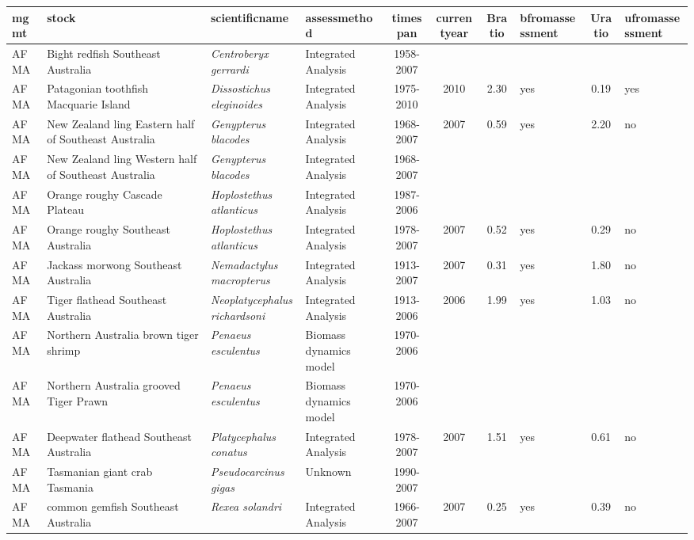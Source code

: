 \begin{longtable}{p{1.8cm}p{3.5cm}p{3.5cm}p{3cm}cccp{0.9cm}cp{0.9cm}}
  \hline
mgmt & stock & scientificname & assessmethod & timespan & currentyear & Bratio & bfromassessment & Uratio & ufromassessment \\ 
  \hline
AFMA & Bight redfish Southeast Australia & \textit{Centroberyx gerrardi} & Integrated Analysis & 1958-2007 &  &  &  &  &  \\ 
  AFMA & Patagonian toothfish Macquarie Island & \textit{Dissostichus eleginoides} & Integrated Analysis & 1975-2010 & 2010 & 2.30 & yes & 0.19 & yes \\ 
  AFMA & New Zealand ling Eastern half of Southeast Australia & \textit{Genypterus blacodes} & Integrated Analysis & 1968-2007 & 2007 & 0.59 & yes & 2.20 & no \\ 
  AFMA & New Zealand ling Western half of Southeast Australia & \textit{Genypterus blacodes} & Integrated Analysis & 1968-2007 &  &  &  &  &  \\ 
  AFMA & Orange roughy Cascade Plateau & \textit{Hoplostethus atlanticus} & Integrated Analysis & 1987-2006 &  &  &  &  &  \\ 
  AFMA & Orange roughy Southeast Australia & \textit{Hoplostethus atlanticus} & Integrated Analysis & 1978-2007 & 2007 & 0.52 & yes & 0.29 & no \\ 
  AFMA & Jackass morwong Southeast Australia & \textit{Nemadactylus macropterus} & Integrated Analysis & 1913-2007 & 2007 & 0.31 & yes & 1.80 & no \\ 
  AFMA & Tiger flathead Southeast Australia & \textit{Neoplatycephalus richardsoni} & Integrated Analysis & 1913-2006 & 2006 & 1.99 & yes & 1.03 & no \\ 
  AFMA & Northern Australia brown tiger shrimp & \textit{Penaeus esculentus} & Biomass dynamics model & 1970-2006 &  &  &  &  &  \\ 
  AFMA & Northern Australia grooved Tiger Prawn & \textit{Penaeus esculentus} & Biomass dynamics model & 1970-2006 &  &  &  &  &  \\ 
  AFMA & Deepwater flathead Southeast Australia & \textit{Platycephalus conatus} & Integrated Analysis & 1978-2007 & 2007 & 1.51 & yes & 0.61 & no \\ 
  AFMA & Tasmanian giant crab Tasmania & \textit{Pseudocarcinus gigas} & Unknown & 1990-2007 &  &  &  &  &  \\ 
  AFMA & common gemfish Southeast Australia & \textit{Rexea solandri} & Integrated Analysis & 1966-2007 & 2007 & 0.25 & yes & 0.39 & no \\ 

\end{longtable}
